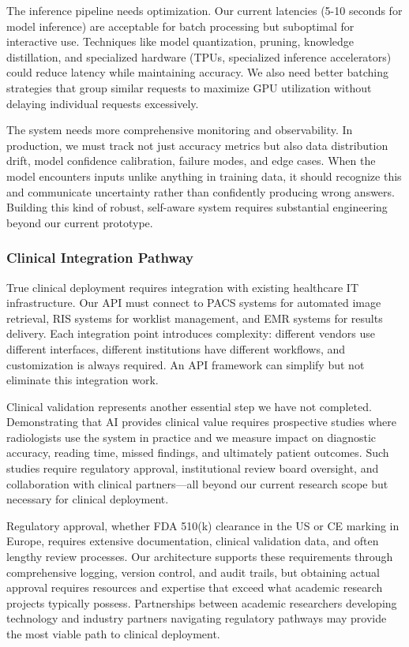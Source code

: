 \documentclass[12pt,a4paper]{article}
\begin{document}
The inference pipeline needs optimization. Our current latencies (5-10 seconds for model inference) are acceptable for batch processing but suboptimal for interactive use. Techniques like model quantization, pruning, knowledge distillation, and specialized hardware (TPUs, specialized inference accelerators) could reduce latency while maintaining accuracy. We also need better batching strategies that group similar requests to maximize GPU utilization without delaying individual requests excessively.

The system needs more comprehensive monitoring and observability. In production, we must track not just accuracy metrics but also data distribution drift, model confidence calibration, failure modes, and edge cases. When the model encounters inputs unlike anything in training data, it should recognize this and communicate uncertainty rather than confidently producing wrong answers. Building this kind of robust, self-aware system requires substantial engineering beyond our current prototype.

\subsubsection{Clinical Integration Pathway}

True clinical deployment requires integration with existing healthcare IT infrastructure. Our API must connect to PACS systems for automated image retrieval, RIS systems for worklist management, and EMR systems for results delivery. Each integration point introduces complexity: different vendors use different interfaces, different institutions have different workflows, and customization is always required. An API framework can simplify but not eliminate this integration work.

Clinical validation represents another essential step we have not completed. Demonstrating that AI provides clinical value requires prospective studies where radiologists use the system in practice and we measure impact on diagnostic accuracy, reading time, missed findings, and ultimately patient outcomes. Such studies require regulatory approval, institutional review board oversight, and collaboration with clinical partners—all beyond our current research scope but necessary for clinical deployment.

Regulatory approval, whether FDA 510(k) clearance in the US or CE marking in Europe, requires extensive documentation, clinical validation data, and often lengthy review processes. Our architecture supports these requirements through comprehensive logging, version control, and audit trails, but obtaining actual approval requires resources and expertise that exceed what academic research projects typically possess. Partnerships between academic researchers developing technology and industry partners navigating regulatory pathways may provide the most viable path to clinical deployment.
\end{document}
